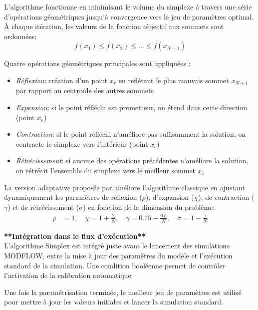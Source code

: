 L'algorithme fonctionne en minimisant le volume du simplexe à travers une série d'opérations géométriques jusqu'à convergence vers le jeu de paramètres optimal. À chaque itération, les valeurs de la fonction objectif aux sommets sont ordonnées:
\begin{equation}
f(x_1) \leq f(x_2) \leq \ldots \leq f(x_{N+1})
\end{equation}

Quatre opérations géométriques principales sont appliquées \parencite{gao_implementing_2012}:
\begin{itemize}
\item \textit{Réflexion}: création d'un point $x_r$ en reflétant le plus mauvais sommet $x_{N+1}$ par rapport au centroïde des autres sommets
\item \textit{Expansion}: si le point réfléchi est prometteur, on étend dans cette direction (point $x_e$)
\item \textit{Contraction}: si le point réfléchi n'améliore pas suffisamment la solution, on contracte le simplexe vers l'intérieur (point $x_c$)
\item \textit{Rétrécissement}: si aucune des opérations précédentes n'améliore la solution, on rétrécit l'ensemble du simplexe vers le meilleur sommet $x_1$
\end{itemize}

La version adaptative proposée par \textcite{gao_implementing_2012} améliore l'algorithme classique en ajustant dynamiquement les paramètres de réflexion ($\rho$), d'expansion ($\chi$), de contraction ($\gamma$) et de rétrécissement ($\sigma$) en fonction de la dimension du problème:
\begin{align}
\rho &= 1, \quad \chi = 1 + \frac{2}{N}, \quad \gamma = 0.75 - \frac{0.5}{N}, \quad \sigma = 1 - \frac{1}{N}
\end{align}

\vspace{2em}
\noindent\textbf{**Intégration dans le flux d'exécution**}\\

L'algorithme Simplex est intégré juste avant le lancement des simulations MODFLOW, entre la mise à jour des paramètres du modèle et l'exécution standard de la simulation. Une condition booléenne permet de contrôler l'activation de la calibration automatique:


Une fois la paramétrisation terminée, le meilleur jeu de paramètres est utilisé pour mettre à jour les valeurs initiales et lancer la simulation standard.

